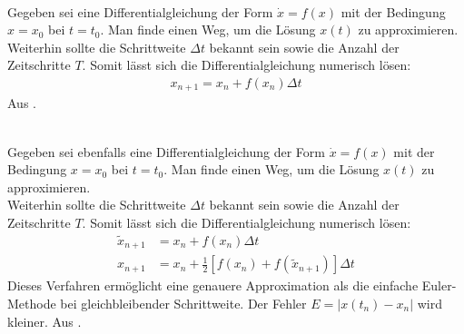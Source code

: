 	\begin{remark}\\
		Gegeben sei eine Differentialgleichung der Form $\dot{x} = f(x)$ mit der Bedingung $x = x_0$ bei $t = t_0$. Man finde einen Weg, um die Lösung $x(t)$ zu approximieren.\\
		Weiterhin sollte die Schrittweite $\Delta t$ bekannt sein sowie die Anzahl der Zeitschritte $T$. Somit lässt sich die Differentialgleichung numerisch lösen:
		\begin{align}
			\label{eq:euler}
			x_{n+1} = x_n + f(x_n) \Delta t
		\end{align}
		Aus \cite{NonlinearDynamics}.
	\end{remark}
	\begin{remark}\\
		Gegeben sei ebenfalls eine Differentialgleichung der Form $\dot{x} = f(x)$ mit der Bedingung $x = x_0$ bei $t = t_0$. Man finde einen Weg, um die Lösung $x(t)$ zu approximieren.\\
		Weiterhin sollte die Schrittweite $\Delta t$ bekannt sein sowie die Anzahl der Zeitschritte $T$. Somit lässt sich die Differentialgleichung numerisch lösen:
		\begin{align}
			\label{eq:erw_euler}
			\tilde{x}_{n+1} &= x_n + f(x_n) \Delta t\\
			x_{n+1} &= x_n + \tfrac{1}{2}[f(x_n) + f(\tilde{x}_{n+1})]\Delta t
		\end{align}
		Dieses Verfahren ermöglicht eine genauere Approximation als die einfache Euler-Methode bei gleichbleibender Schrittweite. Der Fehler $E = |x(t_n)-x_n|$ wird kleiner. Aus \cite{NonlinearDynamics}.
	\end{remark}
